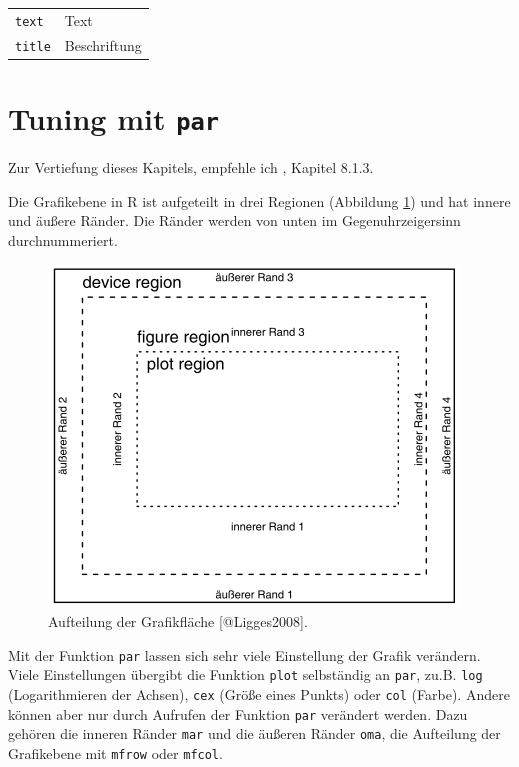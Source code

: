 \documentclass[]{book}
\begin{document}
\begin{longtable}[]{@{}ll@{}}
\begin{minipage}[t]{0.38\columnwidth}\raggedright
\texttt{text}\strut
\end{minipage} & \begin{minipage}[t]{0.56\columnwidth}\raggedright
Text\strut
\end{minipage}\tabularnewline
\begin{minipage}[t]{0.38\columnwidth}\raggedright
\texttt{title}\strut
\end{minipage} & \begin{minipage}[t]{0.56\columnwidth}\raggedright
Beschriftung\strut
\end{minipage}\tabularnewline
\bottomrule
\end{longtable}

\hypertarget{tuning-mit-par}{%
\section{\texorpdfstring{Tuning mit \texttt{par}}{Tuning mit par}}\label{tuning-mit-par}}

Zur Vertiefung dieses Kapitels, empfehle ich \citet{Ligges2008}, Kapitel 8.1.3.

Die Grafikebene in R ist aufgeteilt in drei Regionen (Abbildung \ref{fig:aufteilung}) und hat innere und äußere Ränder. Die Ränder werden von unten im Gegenuhrzeigersinn durchnummeriert.

\begin{figure}
\includegraphics[width=0.8\linewidth]{Regionen_und_Raender} \caption{Aufteilung der Grafikfläche [@Ligges2008].}\label{fig:aufteilung}
\end{figure}

Mit der Funktion \texttt{par} lassen sich sehr viele Einstellung der Grafik verändern. Viele Einstellungen übergibt die Funktion \texttt{plot} selbständig an \texttt{par}, zu.B. \texttt{log} (Logarithmieren der Achsen), \texttt{cex} (Größe eines Punkts) oder \texttt{col} (Farbe). Andere können aber nur durch Aufrufen der Funktion \texttt{par} verändert werden. Dazu gehören die inneren Ränder \texttt{mar} und die äußeren Ränder \texttt{oma}, die Aufteilung der Grafikebene mit \texttt{mfrow} oder \texttt{mfcol}.
\end{document}
